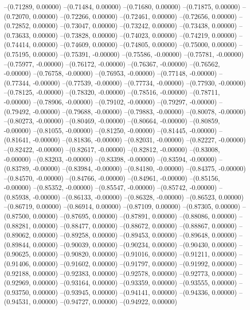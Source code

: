 --(0.71289, 0.00000)
--(0.71484, 0.00000)
--(0.71680, 0.00000)
--(0.71875, 0.00000)
--(0.72070, 0.00000)
--(0.72266, 0.00000)
--(0.72461, 0.00000)
--(0.72656, 0.00000)
--(0.72852, 0.00000)
--(0.73047, 0.00000)
--(0.73242, 0.00000)
--(0.73438, 0.00000)
--(0.73633, 0.00000)
--(0.73828, 0.00000)
--(0.74023, 0.00000)
--(0.74219, 0.00000)
--(0.74414, 0.00000)
--(0.74609, 0.00000)
--(0.74805, 0.00000)
--(0.75000, 0.00000)
--(0.75195, 0.00000)
--(0.75391, -0.00000)
--(0.75586, -0.00000)
--(0.75781, -0.00000)
--(0.75977, -0.00000)
--(0.76172, -0.00000)
--(0.76367, -0.00000)
--(0.76562, -0.00000)
--(0.76758, -0.00000)
--(0.76953, -0.00000)
--(0.77148, -0.00000)
--(0.77344, -0.00000)
--(0.77539, -0.00000)
--(0.77734, -0.00000)
--(0.77930, -0.00000)
--(0.78125, -0.00000)
--(0.78320, -0.00000)
--(0.78516, -0.00000)
--(0.78711, -0.00000)
--(0.78906, -0.00000)
--(0.79102, -0.00000)
--(0.79297, -0.00000)
--(0.79492, -0.00000)
--(0.79688, -0.00000)
--(0.79883, -0.00000)
--(0.80078, -0.00000)
--(0.80273, -0.00000)
--(0.80469, -0.00000)
--(0.80664, -0.00000)
--(0.80859, -0.00000)
--(0.81055, -0.00000)
--(0.81250, -0.00000)
--(0.81445, -0.00000)
--(0.81641, -0.00000)
--(0.81836, -0.00000)
--(0.82031, -0.00000)
--(0.82227, -0.00000)
--(0.82422, -0.00000)
--(0.82617, -0.00000)
--(0.82812, -0.00000)
--(0.83008, -0.00000)
--(0.83203, -0.00000)
--(0.83398, -0.00000)
--(0.83594, -0.00000)
--(0.83789, -0.00000)
--(0.83984, -0.00000)
--(0.84180, -0.00000)
--(0.84375, -0.00000)
--(0.84570, -0.00000)
--(0.84766, -0.00000)
--(0.84961, -0.00000)
--(0.85156, -0.00000)
--(0.85352, -0.00000)
--(0.85547, -0.00000)
--(0.85742, -0.00000)
--(0.85938, -0.00000)
--(0.86133, -0.00000)
--(0.86328, -0.00000)
--(0.86523, 0.00000)
--(0.86719, 0.00000)
--(0.86914, 0.00000)
--(0.87109, 0.00000)
--(0.87305, 0.00000)
--(0.87500, 0.00000)
--(0.87695, 0.00000)
--(0.87891, 0.00000)
--(0.88086, 0.00000)
--(0.88281, 0.00000)
--(0.88477, 0.00000)
--(0.88672, 0.00000)
--(0.88867, 0.00000)
--(0.89062, 0.00000)
--(0.89258, 0.00000)
--(0.89453, 0.00000)
--(0.89648, 0.00000)
--(0.89844, 0.00000)
--(0.90039, 0.00000)
--(0.90234, 0.00000)
--(0.90430, 0.00000)
--(0.90625, 0.00000)
--(0.90820, 0.00000)
--(0.91016, 0.00000)
--(0.91211, 0.00000)
--(0.91406, 0.00000)
--(0.91602, 0.00000)
--(0.91797, 0.00000)
--(0.91992, 0.00000)
--(0.92188, 0.00000)
--(0.92383, 0.00000)
--(0.92578, 0.00000)
--(0.92773, 0.00000)
--(0.92969, 0.00000)
--(0.93164, 0.00000)
--(0.93359, 0.00000)
--(0.93555, 0.00000)
--(0.93750, 0.00000)
--(0.93945, 0.00000)
--(0.94141, 0.00000)
--(0.94336, 0.00000)
--(0.94531, 0.00000)
--(0.94727, 0.00000)
--(0.94922, 0.00000)
